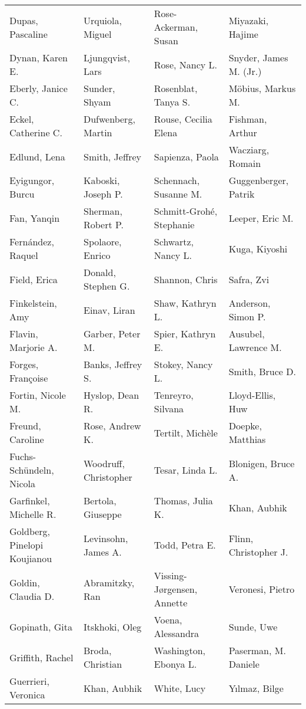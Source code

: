 \begin{ThreePartTable}
{\begin{longtable}[c]{llll}
            Dupas, Pascaline&Urquiola, Miguel&Rose-Ackerman, Susan&Miyazaki, Hajime\\
            Dynan, Karen E.&Ljungqvist, Lars&Rose, Nancy L.&Snyder, James M. (Jr.)\\
            Eberly, Janice C.&Sunder, Shyam&Rosenblat, Tanya S.&Möbius, Markus M.\\
            Eckel, Catherine C.&Dufwenberg, Martin&Rouse, Cecilia Elena&Fishman, Arthur\\
            Edlund, Lena&Smith, Jeffrey&Sapienza, Paola&Wacziarg, Romain\\
            Eyigungor, Burcu&Kaboski, Joseph P.&Schennach, Susanne M.&Guggenberger, Patrik\\
            Fan, Yanqin&Sherman, Robert P.&Schmitt-Grohé, Stephanie&Leeper, Eric M.\\
            Fernández, Raquel&Spolaore, Enrico&Schwartz, Nancy L.&Kuga, Kiyoshi\\
            Field, Erica&Donald, Stephen G.&Shannon, Chris&Safra, Zvi\\
            Finkelstein, Amy&Einav, Liran&Shaw, Kathryn L.&Anderson, Simon P.\\
            Flavin, Marjorie A.&Garber, Peter M.&Spier, Kathryn E.&Ausubel, Lawrence M.\\
            Forges, Françoise&Banks, Jeffrey S.&Stokey, Nancy L.&Smith, Bruce D.\\
            Fortin, Nicole M.&Hyslop, Dean R.&Tenreyro, Silvana&Lloyd-Ellis, Huw\\
            Freund, Caroline&Rose, Andrew K.&Tertilt, Michèle&Doepke, Matthias\\
            Fuchs-Schündeln, Nicola&Woodruff, Christopher&Tesar, Linda L.&Blonigen, Bruce A.\\
            Garfinkel, Michelle R.&Bertola, Giuseppe&Thomas, Julia K.&Khan, Aubhik\\
            Goldberg, Pinelopi Koujianou&Levinsohn, James A.&Todd, Petra E.&Flinn, Christopher J.\\
            Goldin, Claudia D.&Abramitzky, Ran&Vissing-Jørgensen, Annette&Veronesi, Pietro\\
            Gopinath, Gita&Itskhoki, Oleg&Voena, Alessandra&Sunde, Uwe\\
            Griffith, Rachel&Broda, Christian&Washington, Ebonya L.&Paserman, M. Daniele\\
            Guerrieri, Veronica&Khan, Aubhik&White, Lucy&Yılmaz, Bilge\\

\end{longtable}}
\end{ThreePartTable}
